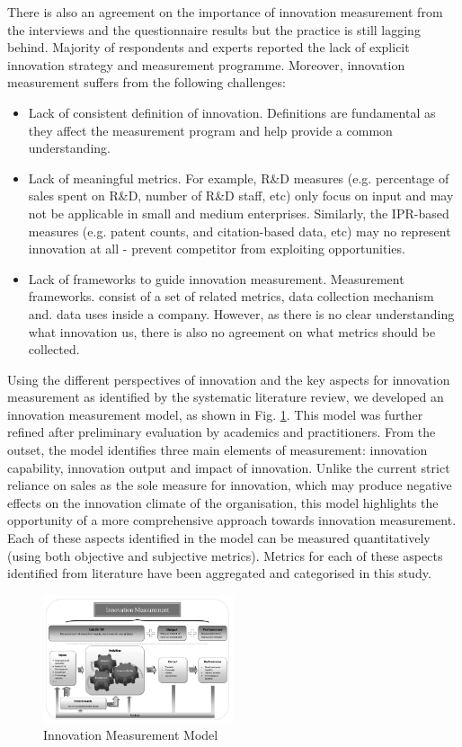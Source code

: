 \documentclass[sigplan]{acmart}
\begin{document}
There is also an agreement on the importance of innovation measurement from the interviews and the questionnaire results but the practice is still lagging behind. Majority of respondents and experts reported the lack of explicit innovation strategy and measurement programme. Moreover, innovation measurement suffers from the following challenges:
\begin{itemize}
	\item Lack of consistent definition of innovation. Definitions are fundamental as they affect the measurement program and help provide a common understanding.
	\item Lack of meaningful metrics. For example, R\&D measures (e.g. percentage of sales spent on R\&D, number of R\&D staff, etc) only focus on input and may not be applicable in small and medium enterprises. Similarly, the IPR-based measures (e.g. patent counts, and citation-based data, etc) may no represent innovation at all - prevent competitor from exploiting opportunities.
	\item Lack of frameworks to guide innovation measurement. Measurement frameworks. consist of a set of related metrics, data collection mechanism and. data uses inside a company. However, as there is no clear understanding what innovation us, there is also no agreement on what metrics should be collected.
\end{itemize}

Using the different perspectives of innovation and the key aspects for innovation measurement as identified by the systematic literature review, we developed an innovation measurement model, as shown in Fig. \ref{fig:im_model}. This model was further refined after preliminary evaluation by academics and practitioners. From the outset, the model identifies three main elements of measurement: innovation capability, innovation output and impact of innovation. Unlike the current strict reliance on sales as the sole measure for innovation, which may produce negative effects on the innovation climate of the organisation, this model highlights the opportunity of a more comprehensive approach towards innovation measurement. Each of these aspects identified in the model can be measured quantitatively (using both objective and subjective metrics). Metrics for each of these aspects identified from literature have been aggregated and categorised in this study.

\begin{figure}[!ht]
\includegraphics[width=0.5\textwidth]{Figures/im_model}
\caption{Innovation Measurement Model}
\label{fig:im_model}
\end{figure}
\end{document}

